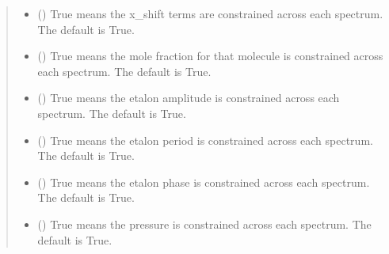\documentclass[letterpaper,10pt,english]{sphinxmanual}
\begin{document}
\begin{fulllineitems}
\begin{fulllineitems}
\begin{quote}
\begin{description}
\begin{itemize}
\item {} 
\sphinxAtStartPar
{} (\sphinxstyleliteralemphasis{\sphinxupquote{, }}) \textendash{} True means the x\_shift terms are constrained across each spectrum. The default is True.

\item {} 
\sphinxAtStartPar
{} (\sphinxstyleliteralemphasis{\sphinxupquote{, }}) \textendash{} True means the mole fraction for that molecule is constrained across each spectrum. The default is True.

\item {} 
\sphinxAtStartPar
{} (\sphinxstyleliteralemphasis{\sphinxupquote{, }}) \textendash{} True means the etalon amplitude is constrained across each spectrum. The default is True.

\item {} 
\sphinxAtStartPar
{} (\sphinxstyleliteralemphasis{\sphinxupquote{, }}) \textendash{} True means the etalon period is constrained across each spectrum. The default is True.

\item {} 
\sphinxAtStartPar
{} (\sphinxstyleliteralemphasis{\sphinxupquote{, }}) \textendash{} True means the etalon phase is constrained across each spectrum. The default is True.

\item {} 
\sphinxAtStartPar
{} (\sphinxstyleliteralemphasis{\sphinxupquote{, }}) \textendash{} True means the pressure is constrained across each spectrum. The default is True.


\end{itemize}
\end{description}
\end{quote}
\end{fulllineitems}
\end{fulllineitems}
\end{document}
